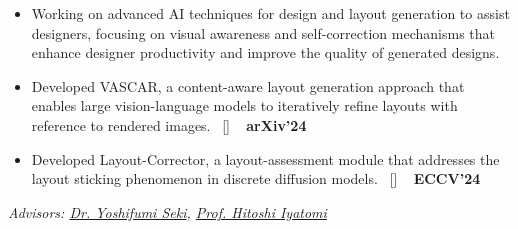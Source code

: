 
\begin{projects}
	{
		\begin{itemize}
			\setlength\itemsep{0.3em}
			\item Working on advanced AI techniques for design and layout generation to assist designers, focusing on visual awareness and self-correction mechanisms that enhance designer productivity and improve the quality of generated designs.
			\item Developed VASCAR, a content-aware layout generation approach that enables large vision-language models to iteratively refine layouts with reference to rendered images.~ [\href{https://arxiv.org/abs/2412.04237}{\small{\arxivSymbol}}] ~ {\small{\lbrack\textbf{{arXiv'24}}\rbrack}}
			\item Developed Layout-Corrector, a layout-assessment module that addresses the layout sticking phenomenon in discrete diffusion models.~ [\href{https://github.com/line/Layout-Corrector}{\small{\arxivSymbol}}] ~ {\small{\lbrack\textbf{{ECCV'24}}\rbrack}}
		\end{itemize}
	}
	{
		\textit{Advisors:  \href{https://scholar.google.com/citations?user=LoZ7VeYAAAAJ}{Dr. Yoshifumi Seki}, \href{https://iyatomi-lab.info/english/people/2013-6-8}{Prof. Hitoshi Iyatomi}}
	}
	{
		\begin{itemize}

\end{itemize}}
\end{projects}
